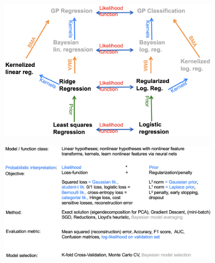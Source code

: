 \documentclass[a4paper]{extarticle}
\begin{document}
\begin{figure}[H]
    \includegraphics[width=15cm]{../images/IntroML_Fig10-8}
    \centering
\end{figure}

\begin{figure}[H]
    \includegraphics[width=15cm]{../images/IntroML_Fig10-9}
    \centering
\end{figure}
\end{document}
